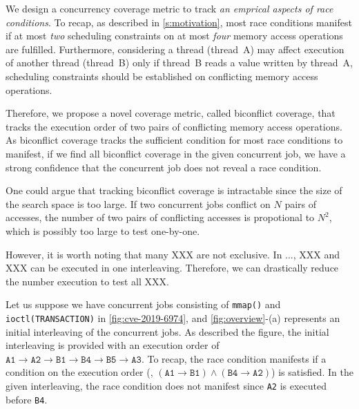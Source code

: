 %
We design a concurrency coverage metric to track \textit{an emprical
  aspects of race conditions}.
%
To recap, as described in \autoref{s:motivation}, most race conditions
manifest if at most \textit{two} scheduling constraints on at most
\textit{four} memory access operations are fulfilled.
%
Furthermore, considering a thread (thread~A) may affect execution of
another thread (thread~B) only if thread~B reads a value written by
thread~A, scheduling constraints should be established on conflicting
memory access operations.

Therefore, we propose a novel coverage metric, called biconflict
coverage, that tracks the execution order of two pairs of conflicting
memory access operations.
%
As biconflict coverage tracks the sufficient condition for most race
conditions to manifest, if we find all biconflict coverage in the
given concurrent job, we have a strong confidence that the concurrent
job does not reveal a race condition.


%
%
One could argue that tracking biconflict coverage is intractable since
the size of the search space is too large.
%
If two concurrent jobs conflict on $N$ pairs of accesses, the number
of two pairs of conflicting accesses is propotional to $N^2$, which is
possibly too large to test one-by-one.

However, it is worth noting that many XXX are not exclusive.
%
In ..., XXX and XXX can be executed in one interleaving.
%
Therefore, we can drastically reduce the number execution to test
all XXX.



%
%
Let us suppose we have concurrent jobs consisting of \texttt{mmap()}
and \texttt{ioctl(TRANSACTION)} in \autoref{fig:cve-2019-6974}, and
\autoref{fig:overview}-(a) represents an initial interleaving of the
concurrent jobs.
%
As described the figure, the initial interleaving is provided with an
execution order of
$\texttt{A1} \rightarrow \texttt{A2} \rightarrow \texttt{B1}
\rightarrow \texttt{B4} \rightarrow \texttt{B5} \rightarrow
\texttt{A3}$.
%
To recap, the race condition manifests if a condition on the execution
order (\ie,
$(\texttt{A1} \rightarrow \texttt{B1}) \wedge (\texttt{B4} \rightarrow
\texttt{A2})$) is satisfied. In the given interleaving, the race
condition does not manifest since \texttt{A2} is executed before
\texttt{B4}.



